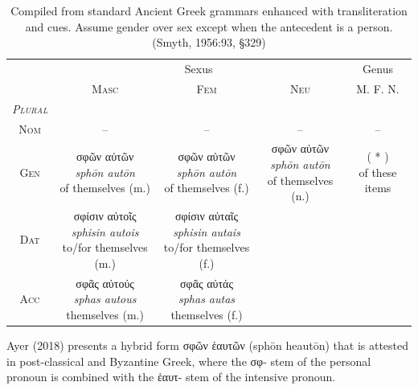 \documentclass[10pt,a4paper,notitlepage]{article}
\newcommand{\tsc}[1]{\textsc{#1}}
\newcommand*{\grc}[1]{\fontspec{Inter}#1\rmfamily}
\newcommand{\trc}[1]{\textit{\fontspec{Tinos}#1}}
\begin{document}
    \begin{table}[H]
        \begin{tabular}{c|ccc|c}
            & \multicolumn{3}{c|}{Sexus} & Genus \\
            & \tsc{Masc} & \tsc{Fem} & \tsc{Neu} & \tsc{M. F. N.} \\
            \hline
            \emph{\tsc{Plural}} & & & & \\
            \tsc{Nom} & -- & -- & -- & -- \\
            \tsc{Gen} & \makecell{\grc{σφῶν αὐτῶν} \\ \trc{sphōn autōn} \\ \small of themselves (m.)}
                    & \makecell{\grc{σφῶν αὐτῶν} \\ \trc{sphōn autōn} \\ \small of themselves (f.)}
                    & \makecell{\grc{σφῶν αὐτῶν} \\ \trc{sphōn autōn} \\ \small of themselves (n.)}
                    & \makecell{( * ) \\ \small of these items} \\
            \tsc{Dat} & \makecell{\grc{σφίσιν αὐτοῖς} \\ \trc{sphisin autois} \\ \small to/for themselves (m.)}
                    & \makecell{\grc{σφίσιν αὐταῖς} \\ \trc{sphisin autais} \\ \small to/for themselves (f.)}
                    & \makecell{--}
                    & \makecell{--} \\
            \tsc{Acc} & \makecell{\grc{σφᾶς αὐτούς} \\ \trc{sphas autous} \\ \small themselves (m.)}
                    & \makecell{\grc{σφᾶς αὐτάς} \\ \trc{sphas autas} \\ \small themselves (f.)}
                    & \makecell{--}
                    & \makecell{--} \\
        \end{tabular}
         \caption{Compiled from standard Ancient Greek grammars enhanced with transliteration and cues.
            Assume gender over sex except when the antecedent is a person.
             (Smyth, 1956:93, \S329)}
     \end{table}

    Ayer (2018) presents a hybrid form \grc{σφῶν ἑαυτῶν} (sphōn heautōn) that is attested in post-classical and
    Byzantine Greek, where the \grc{σφ-} stem of the personal pronoun is combined with the \grc{ἑαυτ-} stem of the
    intensive pronoun.
\end{document}
